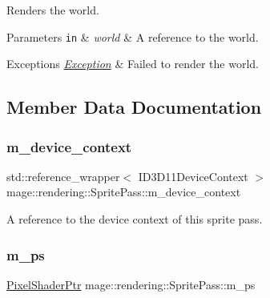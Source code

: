 Renders the world.


\begin{DoxyParams}[1]{Parameters}
\mbox{\tt in}  & {\em world} & A reference to the world. \\
\hline
\end{DoxyParams}

\begin{DoxyExceptions}{Exceptions}
{\em \hyperlink{classmage_1_1_exception}{Exception}} & Failed to render the world. \\
\hline
\end{DoxyExceptions}


\subsection{Member Data Documentation}
\hypertarget{classmage_1_1rendering_1_1_sprite_pass_a9e8435cadd9b3484d9845690204c5706}{}\label{classmage_1_1rendering_1_1_sprite_pass_a9e8435cadd9b3484d9845690204c5706} 
\subsubsection{\texorpdfstring{m\+\_\+device\+\_\+context}{m\_device\_context}}
{\footnotesize\ttfamily std\+::reference\+\_\+wrapper$<$ I\+D3\+D11\+Device\+Context $>$ mage\+::rendering\+::\+Sprite\+Pass\+::m\+\_\+device\+\_\+context\hspace{0.3cm}{\ttfamily [private]}}

A reference to the device context of this sprite pass. \hypertarget{classmage_1_1rendering_1_1_sprite_pass_aac258f752dde77f0e428b8d8725b8e66}{}\label{classmage_1_1rendering_1_1_sprite_pass_aac258f752dde77f0e428b8d8725b8e66} 
\subsubsection{\texorpdfstring{m\+\_\+ps}{m\_ps}}
{\footnotesize\ttfamily \hyperlink{namespacemage_1_1rendering_af03d922b228ee9c8542baaa2ecc9f259}{Pixel\+Shader\+Ptr} mage\+::rendering\+::\+Sprite\+Pass\+::m\+\_\+ps\hspace{0.3cm}{\ttfamily [private]}}

